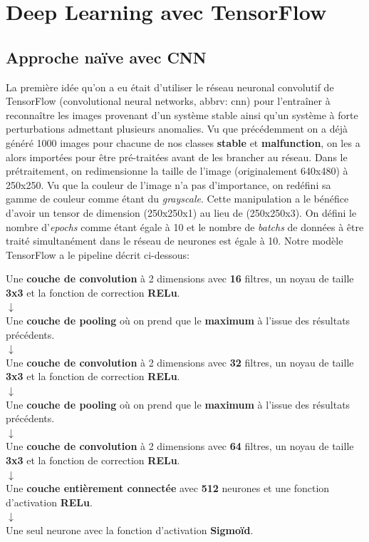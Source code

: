 \documentclass[french]{article}
\theoremstyle{mytheoremstyle}
\theoremstyle{mytheoremstyle}
\theoremstyle{myproblemstyle}
\begin{document}
    \section{Deep Learning avec TensorFlow}
        \subsection{Approche naïve avec CNN}
        La première idée qu'on a eu était d'utiliser le réseau neuronal convolutif de TensorFlow (convolutional neural networks, abbrv: cnn) pour l'entraîner à reconnaître les images provenant d'un système stable ainsi qu'un système à forte perturbations admettant plusieurs anomalies. Vu que précédemment on a déjà généré 1000 images pour chacune de nos classes \textbf{stable} et \textbf{malfunction}, on les a alors importées pour être pré-traitées avant de les brancher au réseau. Dans le prétraitement, on redimensionne la taille de l'image (originalement 640x480) à 250x250. Vu que la couleur de l'image n'a pas d'importance, on redéfini sa gamme de couleur comme étant du \textit{grayscale}. Cette manipulation a le bénéfice d'avoir un tensor de dimension (250x250x1) au lieu de (250x250x3). On défini le nombre d'\textit{epochs} comme étant égale à 10 et le nombre de \textit{batchs} de données à être traité simultanément dans le réseau de neurones est égale à 10. Notre modèle TensorFlow a le pipeline décrit ci-dessous:
        \begin{center}
            Une \textbf{couche de convolution} à 2 dimensions avec \textbf{16} filtres, un noyau de taille \textbf{3x3} et la fonction de correction \textbf{RELu}. \\
            $
            \downarrow
            $\\
            Une \textbf{couche de pooling} où on prend que le \textbf{maximum} à l'issue des résultats précédents. \\
            $
            \downarrow
            $\\
            Une \textbf{couche de convolution} à 2 dimensions avec \textbf{32} filtres, un noyau de taille \textbf{3x3} et la fonction de correction \textbf{RELu}. \\
            $
            \downarrow
            $\\
            Une \textbf{couche de pooling} où on prend que le \textbf{maximum} à l'issue des résultats précédents. \\
            $
            \downarrow
            $\\
            Une \textbf{couche de convolution} à 2 dimensions avec \textbf{64} filtres, un noyau de taille \textbf{3x3} et la fonction de correction \textbf{RELu}.\\
            $
            \downarrow
            $\\
            Une \textbf{couche entièrement connectée} avec \textbf{512} neurones et une fonction d'activation \textbf{RELu}.\\
            $
            \downarrow
            $\\
            Une seul neurone avec la fonction d'activation \textbf{Sigmoïd}.
        \end{center}
\end{document}
